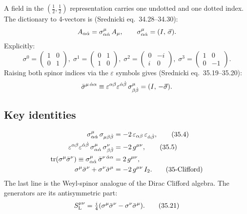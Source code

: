 A field in the $(\tfrac{1}{2},\tfrac{1}{2})$ representation carries one
undotted and one dotted index.  The dictionary to 4-vectors is
(Srednicki eq.~34.28--34.30):
\begin{equation}
  A_{\alpha\dot{\alpha}} = \sigma^\mu_{\alpha\dot{\alpha}}\,A_\mu, \qquad
  \sigma^\mu_{\alpha\dot{\alpha}} = (I,\,\vec\sigma).
\end{equation}
Explicitly:
\begin{equation}
  \sigma^0 = \begin{pmatrix}1&0\\0&1\end{pmatrix},\;
  \sigma^1 = \begin{pmatrix}0&1\\1&0\end{pmatrix},\;
  \sigma^2 = \begin{pmatrix}0&-i\\i&0\end{pmatrix},\;
  \sigma^3 = \begin{pmatrix}1&0\\0&-1\end{pmatrix}.
\end{equation}
Raising both spinor indices via the $\varepsilon$ symbols gives
(Srednicki eq.~35.19--35.20):
\begin{equation}
  \bar{\sigma}^{\mu\,\dot{\alpha}\alpha} \equiv \varepsilon^{\alpha\beta}\varepsilon^{\dot{\alpha}\dot{\beta}}\,
  \sigma^\mu_{\beta\dot{\beta}} = (I,\,-\vec\sigma).
\end{equation}

\subsection{Key identities}

\begin{align}
  \sigma^\mu_{\alpha\dot{\alpha}}\,\sigma_{\mu\beta\dot{\beta}}
    &= -2\,\varepsilon_{\alpha\beta}\,\varepsilon_{\dot{\alpha}\dot{\beta}},
    \tag{35.4} \\
  \varepsilon^{\alpha\beta}\varepsilon^{\dot{\alpha}\dot{\beta}}\,
  \sigma^\mu_{\alpha\dot{\alpha}}\,\sigma^\nu_{\beta\dot{\beta}}
    &= -2\,g^{\mu\nu},
    \tag{35.5} \\
  \operatorname{tr}(\sigma^\mu\bar{\sigma}^\nu) \equiv
  \sigma^\mu_{\alpha\dot{\alpha}}\,\bar{\sigma}^{\nu\,\dot{\alpha}\alpha}
    &= 2\,g^{\mu\nu}, \\
  \sigma^\mu\bar{\sigma}^\nu + \sigma^\nu\bar{\sigma}^\mu
    &= -2\,g^{\mu\nu}\,I_2.
    \tag{35-Clifford}
\end{align}
The last line is the Weyl-spinor analogue of the Dirac Clifford algebra.
The generators are its antisymmetric part:
\begin{equation}
  S^{\mu\nu}_{\mathrm{L}} = \tfrac{i}{4}(\sigma^\mu\bar{\sigma}^\nu - \sigma^\nu\bar{\sigma}^\mu).
  \tag{35.21}
\end{equation}

